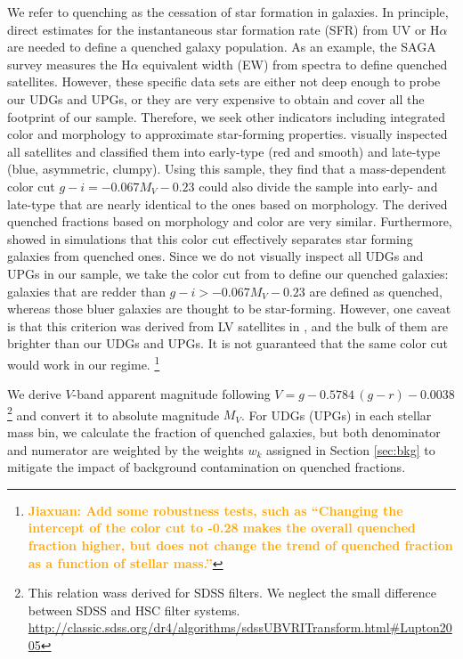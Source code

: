 \documentclass[twocolumn,astrosymb,twocolappendix]{aastex631}
\newcommand{\jiaxuan}[1]{\textcolor{orange}{\textbf{Jiaxuan: #1}}}
\begin{document}
\begin{CJK*}{UTF8}{gbsn}
We refer to quenching as the cessation of star formation in galaxies. In principle, direct estimates for the instantaneous star formation rate (SFR) from UV or H$\alpha$ are needed to define a quenched galaxy  population. As an example, the SAGA survey measures the H$\alpha$ equivalent width (EW) from spectra to define quenched satellites. However, these specific data sets are either not deep enough to probe our UDGs and UPGs, or they are very expensive to obtain and cover all the footprint of our sample. Therefore, we seek other indicators including integrated color and morphology to approximate star-forming properties. \citet{CarlstenELVES2022} visually inspected all satellites and classified them into early-type (red and smooth) and late-type (blue, asymmetric, clumpy). Using this sample, they find that a mass-dependent color cut $g-i = -0.067 M_V - 0.23$ could also divide the sample into early- and late-type that are nearly identical to the ones based on morphology. The derived quenched fractions based on morphology and color are very similar. Furthermore, \citet{Font2022} showed in simulations that this color cut effectively separates star forming galaxies from quenched ones. Since we do not visually inspect all UDGs and UPGs in our sample, we take the color cut from \citet{CarlstenELVES2022} to define our quenched galaxies: galaxies that are redder than $g-i > -0.067 M_V - 0.23$ are defined as quenched, whereas those bluer galaxies are thought to be star-forming. However, one caveat is that this criterion was derived from LV satellites in \citet{CarlstenELVES2022}, and the bulk of them are brighter than our UDGs and UPGs. It is not guaranteed that the same color cut would work in our regime. \footnote{\jiaxuan{Add some robustness tests, such as ``Changing the intercept of the color cut to -0.28 makes the overall quenched fraction higher, but does not change the trend of quenched fraction as a function of stellar mass.''}}

We derive $V$-band apparent magnitude following $V = g - 0.5784\, (g - r) - 0.0038$\footnote{This relation wass derived for SDSS filters. We neglect the small difference between SDSS and HSC filter systems. \url{http://classic.sdss.org/dr4/algorithms/sdssUBVRITransform.html\#Lupton2005}} and convert it to absolute magnitude $M_V$. For UDGs (UPGs) in each stellar mass bin, we calculate the fraction of quenched galaxies, but both denominator and numerator are weighted by the weights $w_k$ assigned in Section \ref{sec:bkg} to mitigate the impact of background contamination on quenched fractions. 


\end{CJK*}
\end{document}
